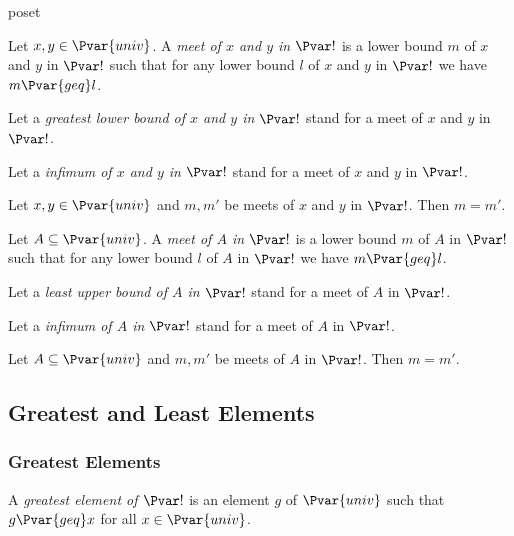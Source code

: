 \documentclass{stex}
\begin{document}
\begin{smodule}{poset}
  \begin{forthel}
    \begin{definition*}
      Let $x, y \in \Pvar{univ}$.
      A \emph{meet of $x$ and $y$ in $\Pvar!$} is a lower bound $m$ of $x$ and $y$ in $\Pvar!$ such that for any lower bound $l$ of $x$ and $y$ in $\Pvar!$ we have $m {\Pvar{geq}} l$.
    \end{definition*}

    Let a \emph{greatest lower bound of $x$ and $y$ in $\Pvar!$} stand for a meet of $x$ and $y$ in $\Pvar!$.

    Let a \emph{infimum of $x$ and $y$ in $\Pvar!$} stand for a meet of $x$ and $y$ in $\Pvar!$.

    \begin{proposition*}
      Let $x, y \in \Pvar{univ}$ and $m, m'$ be meets of $x$ and $y$ in $\Pvar!$.
      Then $m = m'$.
    \end{proposition*}
    
    \begin{definition*}
      Let $A \subseteq \Pvar{univ}$.
      A \emph{meet of $A$ in $\Pvar!$} is a lower bound $m$ of $A$ in $\Pvar!$ such that for any lower bound $l$ of $A$ in $\Pvar!$ we have $m {\Pvar{geq}} l$.
    \end{definition*}

    Let a \emph{least upper bound of $A$ in $\Pvar!$} stand for a meet of $A$ in $\Pvar!$.

    Let a \emph{infimum of $A$ in $\Pvar!$} stand for a meet of $A$ in $\Pvar!$.

    \begin{proposition*}
      Let $A \subseteq \Pvar{univ}$ and $m, m'$ be meets of $A$ in $\Pvar!$.
      Then $m = m'$.
    \end{proposition*}
  \end{forthel}

  \subsection{Greatest and Least Elements}

  \subsubsection{Greatest Elements}

  \begin{forthel}
    \begin{definition*}
      A \emph{greatest element of $\Pvar!$} is an element $g$ of $\Pvar{univ}$ such that $g {\Pvar{geq}} x$ for all $x \in \Pvar{univ}$.
    \end{definition*}


\end{forthel}
\end{smodule}
\end{document}
